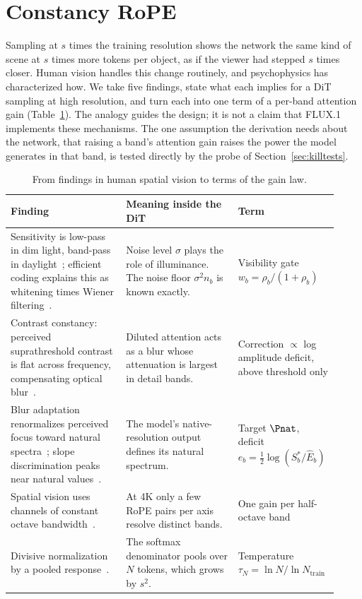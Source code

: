 \section{Constancy RoPE}
\label{sec:method}

Sampling at $s$ times the training resolution shows the network the same kind of scene at $s$ times more tokens per object, as if the viewer had stepped $s$ times closer. Human vision handles this change routinely, and psychophysics has characterized how. We take five findings, state what each implies for a DiT sampling at high resolution, and turn each into one term of a per-band attention gain (Table~\ref{tab:mapping}). The analogy guides the design; it is not a claim that FLUX.1 implements these mechanisms. The one assumption the derivation needs about the network, that raising a band's attention gain raises the power the model generates in that band, is tested directly by the probe of Section~\ref{sec:killtests}.

\begin{table}[t]
\centering
\small
\caption{From findings in human spatial vision to terms of the gain law.}
\label{tab:mapping}
\begin{tabular}{@{}p{0.34\linewidth}p{0.33\linewidth}p{0.25\linewidth}@{}}
\toprule
Finding & Meaning inside the DiT & Term \\
\midrule
Sensitivity is low-pass in dim light, band-pass in daylight~\citep{vannes1967spatial}; efficient coding explains this as whitening times Wiener filtering~\citep{atick1990towards,atick1992retina,vanhateren1992theory}. & Noise level $\sigma$ plays the role of illuminance. The noise floor $\sigma^2 n_b$ is known exactly. & Visibility gate $w_b=\rho_b/(1+\rho_b)$ \\
\addlinespace
Contrast constancy: perceived suprathreshold contrast is flat across frequency, compensating optical blur~\citep{georgeson1975contrast}. & Diluted attention acts as a blur whose attenuation is largest in detail bands. & Correction $\propto$ log amplitude deficit, above threshold only \\
\addlinespace
Blur adaptation renormalizes perceived focus toward natural spectra~\citep{webster2002neural}; slope discrimination peaks near natural values~\citep{knill1990human,parraga2000human}. & The model's native-resolution output defines its natural spectrum. & Target $\Pnat$, deficit $e_b=\tfrac12\log(S^*_b/\hat E_b)$ \\
\addlinespace
Spatial vision uses channels of constant octave bandwidth~\citep{campbell1968application,field1987relations}. & At 4K only a few RoPE pairs per axis resolve distinct bands. & One gain per half-octave band \\
\addlinespace
Divisive normalization by a pooled response~\citep{heeger1992normalization,carandini2012normalization,schwartz2001natural}. & The softmax denominator pools over $N$ tokens, which grows by $s^2$. & Temperature $\tau_N=\ln N/\ln N_{\mathrm{train}}$ \\
\bottomrule
\end{tabular}
\end{table}

